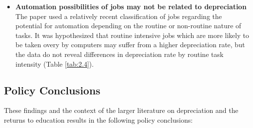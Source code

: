 \documentclass[alpha-refs]{wiley-article-02b}
\begin{document}
\begin{itemize}
\item \textbf{Automation possibilities of jobs may not be 
related 
to depreciation} The paper used a relatively recent classification of jobs 
regarding the potential for automation depending on the routine or 
non-routine nature of tasks. It was hypothesized that routine intensive 
jobs which are more likely to be taken overy by computers may suffer from a 
higher depreciation rate, but the data do not reveal differences in 
depreciation rate by routine task intensity (Table \ref{tab:2.4}).

\end{itemize}


\subsection{Policy Conclusions}

These findings and the context of the larger literature on depreciation and 
the returns to education results in the following policy conclusions:
\end{document}
